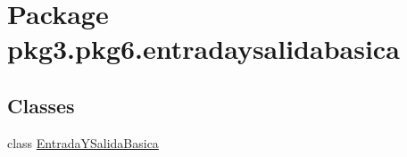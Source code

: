 \hypertarget{namespacepkg3_1_1pkg6_1_1entradaysalidabasica}{}\section{Package pkg3.\+pkg6.\+entradaysalidabasica}
\label{namespacepkg3_1_1pkg6_1_1entradaysalidabasica}
\subsection*{Classes}
\begin{DoxyCompactItemize}
\item 
class \mbox{\hyperlink{classpkg3_1_1pkg6_1_1entradaysalidabasica_1_1_entrada_y_salida_basica}{Entrada\+Y\+Salida\+Basica}}
\end{DoxyCompactItemize}
